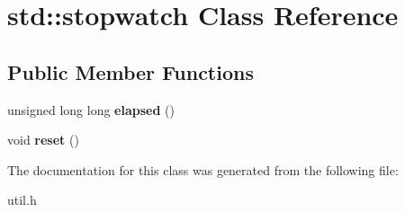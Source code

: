 \hypertarget{classstd_1_1stopwatch}{}\section{std\+:\+:stopwatch Class Reference}
\label{classstd_1_1stopwatch}
\subsection*{Public Member Functions}
\begin{DoxyCompactItemize}
\item 
\mbox{\label{classstd_1_1stopwatch_a22faf18080d92a5e19145d54d776d6bb}} 
unsigned long long {\bfseries elapsed} ()
\item 
\mbox{\label{classstd_1_1stopwatch_aef56145243c8dd37f74466dff4710446}} 
void {\bfseries reset} ()
\end{DoxyCompactItemize}


The documentation for this class was generated from the following file\+:\begin{DoxyCompactItemize}
\item 
util.\+h\end{DoxyCompactItemize}

